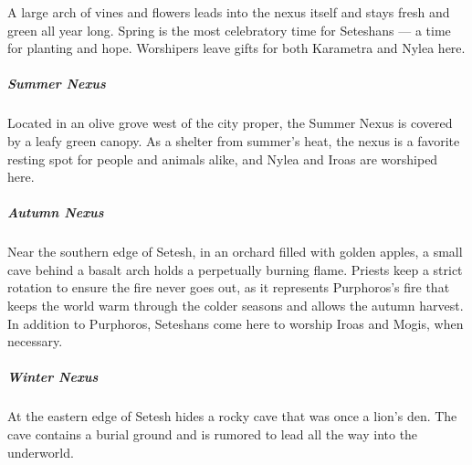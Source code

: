         \newpage


        \vspace{12.5cm}

        A large arch of vines and flowers leads into the nexus itself and stays fresh and green all year long.
        Spring is the most celebratory time for Seteshans --- a time for planting and hope.
        Worshipers leave gifts for both Karametra and Nylea here.

        \subparagraph{Summer Nexus} Located in an olive grove west of the city proper, the Summer Nexus is covered by a leafy green canopy.
        As a shelter from summer's heat, the nexus is a favorite resting spot for people and animals alike, and Nylea and Iroas are worshiped here.

        \subparagraph{Autumn Nexus} Near the southern edge of Setesh, in an orchard filled with golden apples, a small cave behind a basalt arch holds a perpetually burning flame.
        Priests keep a strict rotation to ensure the fire never goes out, as it represents Purphoros's fire that keeps the world warm through the colder seasons and allows the autumn harvest.
        In addition to Purphoros, Seteshans come here to worship Iroas and Mogis, when necessary.

        \subparagraph{Winter Nexus} At the eastern edge of Setesh hides a rocky cave that was once a lion's den.
        The cave contains a burial ground and is rumored to lead all the way into the underworld.

